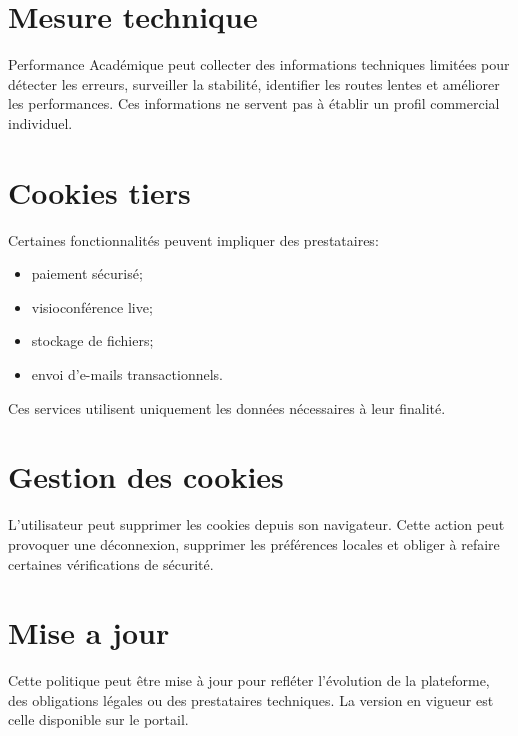 \documentclass[11pt,a4paper]{article}
\begin{document}
\section{Mesure technique}
Performance Académique peut collecter des informations techniques limitées pour détecter les erreurs, surveiller la stabilité, identifier les routes lentes et améliorer les performances. Ces informations ne servent pas à établir un profil commercial individuel.

\section{Cookies tiers}
Certaines fonctionnalités peuvent impliquer des prestataires:
\begin{itemize}
  \item paiement sécurisé;
  \item visioconférence live;
  \item stockage de fichiers;
  \item envoi d'e-mails transactionnels.
\end{itemize}
Ces services utilisent uniquement les données nécessaires à leur finalité.

\section{Gestion des cookies}
L'utilisateur peut supprimer les cookies depuis son navigateur. Cette action peut provoquer une déconnexion, supprimer les préférences locales et obliger à refaire certaines vérifications de sécurité.

\section{Mise a jour}
Cette politique peut être mise à jour pour refléter l'évolution de la plateforme, des obligations légales ou des prestataires techniques. La version en vigueur est celle disponible sur le portail.

\PAContactBlock
\end{document}
